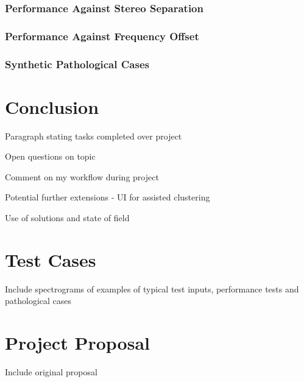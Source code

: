 \documentclass[10pt,twoside,a4paper]{report}
\begin{document}
\subsection{Performance Against Stereo Separation}

\subsection{Performance Against Frequency Offset}

\subsection{Synthetic Pathological Cases}

\chapter{Conclusion}

Paragraph stating tasks completed over project

Open questions on topic

Comment on my workflow during project

Potential further extensions - UI for assisted clustering

Use of solutions and state of field

\appendix

\chapter{Test Cases}

Include spectrograms of examples of typical test inputs, performance tests and pathological cases

\chapter{Project Proposal}

Include original proposal
\end{document}
